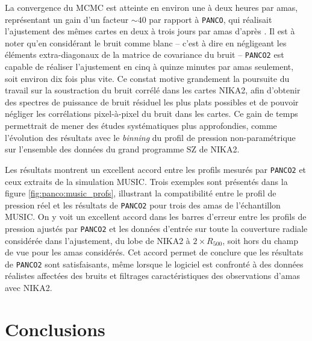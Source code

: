 La convergence du MCMC est atteinte en environ une à deux heures par amas, représentant un gain d'un facteur $\sim 40$ par rapport à \texttt{PANCO}, qui réalisait l'ajustement des mêmes cartes en deux à trois jours par amas d'après \footnotemark.
Il est à noter qu'en considérant le bruit comme blanc -- c'est à dire en négligeant les éléments extra-diagonaux de la matrice de covariance du bruit -- \texttt{PANCO2} est capable de réaliser l'ajustement en cinq à quinze minutes par amas seulement, soit environ dix fois plus vite.
Ce constat motive grandement la poursuite du travail sur la soustraction du bruit corrélé dans les cartes NIKA2, afin d'obtenir des spectres de puissance de bruit résiduel les plus plats possibles et de pouvoir négliger les corrélations pixel-à-pixel du bruit dans les cartes.
Ce gain de temps permettrait de mener des études systématiques plus approfondies, comme l'évolution des résultats avec le \textit{binning} du profil de pression non-paramétrique sur l'ensemble des données du grand programme SZ de NIKA2.

Les résultats montrent un excellent accord entre les profils mesurés par \texttt{PANCO2} et ceux extraits de la simulation MUSIC.
Trois exemples sont présentés dans la figure \ref{fig:panco:music_profs}, illustrant la compatibilité entre le profil de pression réel et les résultats de \texttt{PANCO2} pour trois des amas de l'échantillon MUSIC.
On y voit un excellent accord dans les barres d'erreur entre les profils de pression ajustés par \texttt{PANCO2} et les données d'entrée sur toute la couverture radiale considérée dans l'ajustement, du lobe de NIKA2 à $2 \times R_{500}$, soit hors du champ de vue pour les amas considérés.
Cet accord permet de conclure que les résultats de \texttt{PANCO2} sont satisfaisants, même lorsque le logiciel est confronté à des données réalistes affectées des bruits et filtrages caractéristiques des observations d'amas avec NIKA2.

\section{Conclusions}

